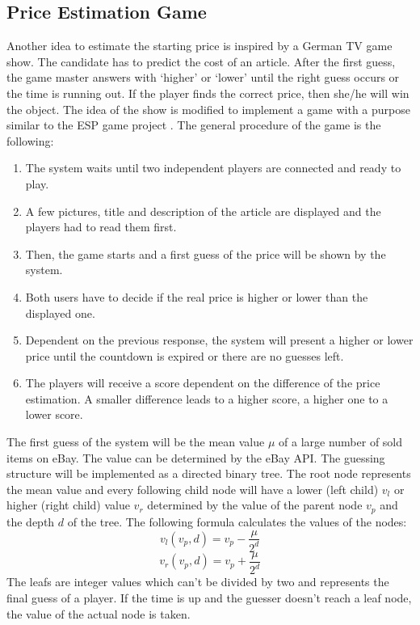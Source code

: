 \subsection{Price Estimation Game}
Another idea to estimate the starting price is inspired by a German TV game show. The candidate has to predict the cost of an article. After the first guess, the game master answers with `higher' or `lower' until the right guess occurs or the time is running out. If the player finds the correct price, then she/he will win the object.  
The idea of the show is modified to implement a game with a purpose similar to the ESP game project \cite{esp}. The general procedure of the game is the following: 
\begin{enumerate}
	\item The system waits until two independent players are connected and ready to play. 
	\item A few pictures, title and description of the article are displayed and the players had to read them first. 
	\item Then, the game starts and a first guess of the price will be shown by the system. 
	\item Both users have to decide if the real price is higher or lower than the displayed one. 
	\item Dependent on the previous response, the system will present a higher or lower price until the countdown is expired or there are no guesses left. 
	\item The players will receive a score dependent on the difference of the price estimation. A smaller difference leads to a higher score, a higher one to a lower score. 
\end{enumerate}
The first guess of the system will be the mean value \( \mu \) of a large number of sold items on eBay. The value can be determined by the eBay API. The guessing structure will be implemented as a directed binary tree. The root node represents the mean value and every following child node will have a lower (left child) \( v_l \) or higher (right child) value  \( v_r \) determined by the value of the parent node  \( v_p \) and the depth  \( d \) of the tree. The following formula calculates the values  of the nodes: 
\begin{equation}
v_l(v_p,d) = v_p - \frac{\mu}{2^d}
\end{equation}
\begin{equation}
v_r(v_p,d) = v_p + \frac{\mu}{2^d}
\end{equation}
The leafs are integer values which can't be divided by two and represents the final guess of a player. If the time is up and the guesser doesn't reach a leaf node, the value of the actual node is taken. 

